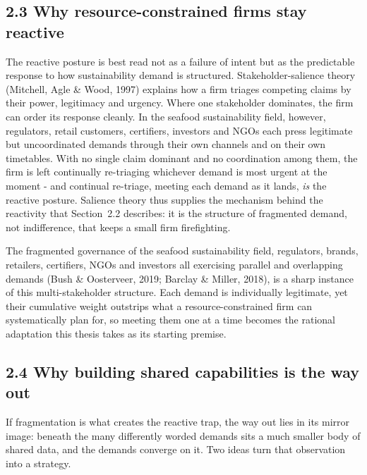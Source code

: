 \documentclass[
]{article}
\begin{document}
\subsection{2.3 Why resource-constrained firms stay
reactive}\label{stakeholder-pressure-and-fragmented-governance}

The reactive posture is best read not as a failure of intent but as the predictable
response to how sustainability demand is structured. Stakeholder-salience theory
(Mitchell, Agle \& Wood, 1997) explains how a firm triages competing claims by
their power, legitimacy and urgency. Where one stakeholder dominates, the firm can
order its response cleanly. In the seafood sustainability field, however,
regulators, retail customers, certifiers, investors and NGOs each press legitimate
but uncoordinated demands through their own channels and on their own timetables.
With no single claim dominant and no coordination among them, the firm is left
continually re-triaging whichever demand is most urgent at the moment - and
continual re-triage, meeting each demand as it lands, \emph{is} the reactive
posture. Salience theory thus supplies the mechanism behind the reactivity that
Section~2.2 describes: it is the structure of fragmented demand, not indifference,
that keeps a small firm firefighting.

The fragmented governance of the seafood sustainability field, regulators,
brands, retailers, certifiers, NGOs and investors all exercising parallel and
overlapping demands (Bush \& Oosterveer, 2019; Barclay \& Miller, 2018), is a
sharp instance of this multi-stakeholder structure. Each demand is individually
legitimate, yet their cumulative weight outstrips what a resource-constrained firm can
systematically plan for, so meeting them one at a time becomes the rational
adaptation this thesis takes as its starting premise.

\subsection{2.4 Why building shared capabilities is the way
out}\label{the-bridge-cross-stakeholder-demand-convergence}

If fragmentation is what creates the reactive trap, the way out lies in its mirror
image: beneath the many differently worded demands sits a much smaller body of
shared data, and the demands converge on it. Two ideas turn that observation into a
strategy.
\end{document}
